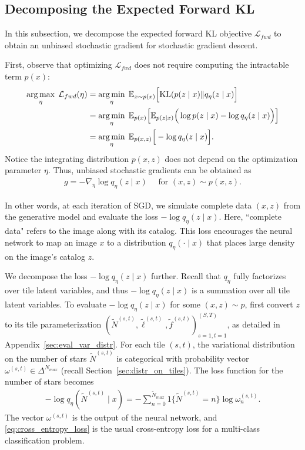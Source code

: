 \subsection{Decomposing the Expected Forward KL}
\label{sec:sleep_details}
In this subsection, we decompose the expected forward KL objective $\mathcal{L}_{fwd}$ 
to obtain an unbiased stochastic gradient for stochastic gradient descent. 

First, observe that optimizing $\mathcal{L}_{fwd}$ does not require computing the intractable term $p(x)$:
\begin{align}
\operatorname*{arg\,max}_\eta\; \mathcal{L}_{fwd}(\eta)
    & = \operatorname*{arg\,min}_{\eta} \; \mathbb{E}_{x \sim p(x)}\Big[ \mathrm{KL}(p(z \mid x) \| q_\eta(z \mid x)\Big] \\
  &=\operatorname*{arg\,min}_{\eta} \; \mathbb E_{p(x)}\Big[\mathbb E_{p(z \mid x)}\Big(\log p(z \mid x) - \log q_\eta(z \mid x) \Big)\Big]\\
&=\operatorname*{arg\,min}_{\eta} \; \mathbb E_{p(x, z)}\Big[- \log q_\eta(z \mid x) \Big]\label{eq:sleep_loss_simple}.
\end{align}
Notice the integrating distribution $p(x,z)$ does not depend on the optimization parameter $\eta$.
Thus, unbiased stochastic gradients can be obtained as
\begin{align}
    g = -\nabla_\eta \log q_\eta(z \mid x) \quad \text{ for } (x, z)\sim p(x, z).
\end{align}

In other words, at each iteration of SGD, we simulate complete data $(x,z)$ from the generative model and evaluate the loss $-\log q_\eta(z \mid x)$.
Here, ``complete data" refers to the image along with its catalog.
This loss encourages the neural network to map an image $x$ to a distribution $q_{\eta}(\cdot \mid x)$ that places large density on the image's catalog $z$.

We decompose the loss $-\log q_\eta(z \mid x)$ further.
Recall that $q_\eta$ fully factorizes over tile latent variables, and thus $-\log q_\eta(z \mid x)$ is a summation over all tile latent variables.
To evaluate $-\log q_\eta(z \mid x)$ for some $(x,z)\sim p$, first convert $z$ to its tile parameterization $(\tilde N^{(s,t)}, \tilde \ell^{(s,t)}, \tilde f^{(s,t)})_{s=1,t=1}^{(S,T)}$, as detailed in Appendix~\ref{sec:eval_var_distr}.
For each tile $(s,t)$, the variational distribution on the number of stars $\tilde N^{(s,t)}$ is categorical with probability vector $\omega^{(s,t)}\in\Delta^{N_{max}}$ (recall Section~\ref{sec:distr_on_tiles}).
The loss function for the number of stars becomes
\begin{align}
    - \log q_\eta(\tilde N^{(s,t)} \mid x) = -\sum_{n = 0}^{\tilde N_{max}} 1\{\tilde N^{(s,t)} = n\} \log \omega^{(s,t)}_n.
    \label{eq:cross_entropy_loss}
\end{align}
The vector $\omega^{(s,t)}$ is the output of the neural network, and \eqref{eq:cross_entropy_loss} is the usual cross-entropy loss for a multi-class classification problem.

